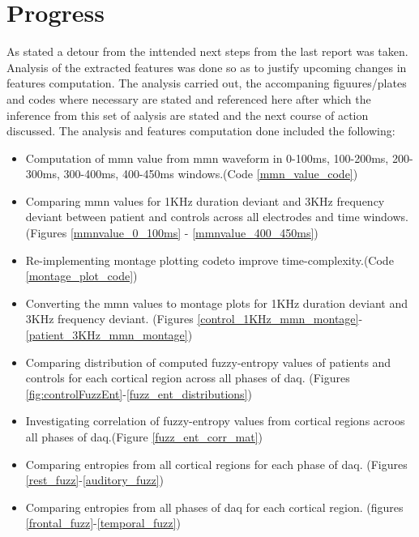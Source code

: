 \documentclass[10pt]{article}
\begin{document}
\section{Progress}
As stated a detour from the inttended next steps from the last report was taken. 
Analysis of the extracted features was done so as to justify upcoming changes in 
features computation. The analysis carried out, the accompaning figuures/plates and 
codes where necessary are stated and referenced here after which the inference from 
this set of aalysis are stated and the next course of action discussed. The analysis 
and features computation done included the following:
\begin{itemize}
  \item Computation of \gls{mmn} value from \gls{mmn} waveform in 0-100ms, 100-200ms, 
  200-300ms, 300-400ms, 400-450ms windows.(Code \ref{mmn_value_code})
  \item Comparing \gls{mmn} values for 1KHz duration deviant and 3KHz frequency deviant 
  between patient and controls across all electrodes and time windows.
  (Figures \ref{mmnvalue_0_100ms} - \ref{mmnvalue_400_450ms})
  \item Re-implementing montage plotting codeto improve time-complexity.(Code \ref{montage_plot_code})
  \item Converting the \gls{mmn} values to montage plots for 1KHz duration deviant 
  and 3KHz frequency deviant.
  (Figures \ref{control_1KHz_mmn_montage}-\ref{patient_3KHz_mmn_montage})
  \item Comparing distribution of computed fuzzy-entropy values of patients and controls 
  for each cortical region across all phases of \gls{daq}.
  (Figures \ref{fig:controlFuzzEnt}-\ref{fuzz_ent_distributions}) 
  \item Investigating correlation of fuzzy-entropy values from cortical regions acroos 
  all phases of \gls{daq}.(Figure \ref{fuzz_ent_corr_mat})
  \item Comparing entropies from all cortical regions for each phase of \gls{daq}.
  (Figures \ref{rest_fuzz}-\ref{auditory_fuzz})
  \item Comparing entropies from all phases of \gls{daq} for each cortical region.
  (figures \ref{frontal_fuzz}-\ref{temporal_fuzz})
\end{itemize} 
\end{document}
